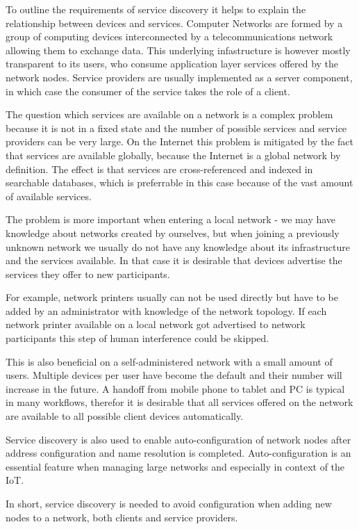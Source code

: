 \documentclass[conference]{IEEEtran}
\begin{document}
To outline the requirements of service discovery it helps to explain the relationship between devices and services.
Computer Networks are formed by a group of computing devices interconnected by a telecommunications network allowing them to exchange data. This underlying infastructure is however mostly transparent to its users, who consume application layer services offered by the network nodes. Service providers are usually implemented as a server component, in which case the consumer of the service takes the role of a client.

The question which services are available on a network is a complex problem because it is not in a fixed state and the number of possible services and service providers can be very large. On the Internet this problem is mitigated by the fact that services are available globally, because the Internet is a global network by definition. The effect is that services are cross-referenced and indexed in searchable databases, which is preferrable in this case because of the vast amount of available services.


The problem is more important when entering a local network - we may have knowledge about networks created by ourselves, but when joining a previously unknown network we usually do not have any knowledge about its infrastructure and the services available.
In that case it is desirable that devices advertise the services they offer to new participants. 

For example, network printers usually can not be used directly but have to be added by an administrator with knowledge of the network topology. If each network printer available on a local network got advertised to network participants this step of human interference could be skipped. 

This is also beneficial on a self-administered network with a small amount of users.
Multiple devices per user have become the default and their number will increase in the future. A handoff from mobile phone to tablet and PC is typical in many workflows, therefor it is desirable that all services offered on the network are available to all possible client devices automatically.

Service discovery is also used to enable auto-configuration of network nodes after address configuration and name resolution is completed. Auto-configuration is an essential feature when managing large networks and especially in context of the IoT.

In short, service discovery is needed to avoid configuration when adding new nodes to a network, both clients and service providers. 
\end{document}
